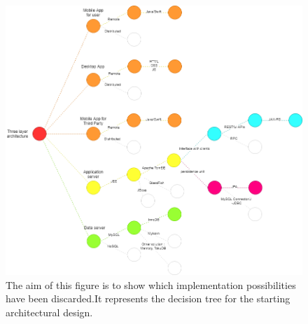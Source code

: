\begin{figure}[h!]
	\includegraphics[width=1.0\textwidth]{./pictures/choice_diagram.png}\par
	\caption{The aim of this figure is to show which implementation possibilities have been discarded.It represents the decision 			tree for the starting architectural design. }
\end{figure}
\FloatBarrier
